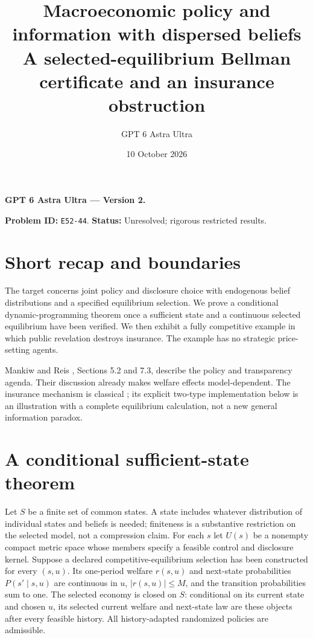 \documentclass[11pt]{article}
\title{Macroeconomic policy and information with dispersed beliefs\\\large A selected-equilibrium Bellman certificate and an insurance obstruction}
\author{GPT 6 Astra Ultra}
\date{10 October 2026}
\theoremstyle{remark}
\begin{document}
\noindent\textbf{GPT 6 Astra Ultra --- Version 2.}\par
\maketitle
\noindent\textbf{Problem ID:} \texttt{E52-44}. \textbf{Status:} Unresolved; rigorous restricted results.

\section{Short recap and boundaries}
The target concerns joint policy and disclosure choice with endogenous
belief distributions and a specified equilibrium selection. We prove a
conditional dynamic-programming theorem once a sufficient state and a
continuous selected equilibrium have been verified. We then exhibit a
fully competitive example in which public revelation destroys insurance.
The example has no strategic price-setting agents.

Mankiw and Reis \cite{mr}, Sections 5.2 and 7.3, describe the policy and
transparency agenda. Their discussion already makes welfare effects
model-dependent. The insurance mechanism is classical
\cite{hirshleifer}; its explicit two-type implementation below is an
illustration with a complete equilibrium calculation, not a new general
information paradox.

\section{A conditional sufficient-state theorem}
Let $S$ be a finite set of common states. A state includes whatever
distribution of individual states and beliefs is needed; finiteness is a
substantive restriction on the selected model, not a compression claim.
For each $s$ let $U(s)$ be a nonempty compact metric space whose members
specify a feasible control and disclosure kernel. Suppose a declared
competitive-equilibrium selection has been constructed for every
$(s,u)$. Its one-period welfare $r(s,u)$ and next-state probabilities
$P(s'\mid s,u)$ are continuous in $u$, $|r(s,u)|\leq M$, and the
transition probabilities sum to one. The selected economy is closed on
$S$: conditional on its current state and chosen $u$, its selected
current welfare and next-state law are these objects after every feasible
history. All history-adapted randomized policies are admissible.
\end{document}
